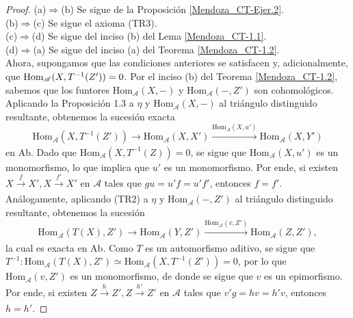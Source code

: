 \documentclass[tesis]{subfiles}
\begin{document}
\begin{proof}\leavevmode

    (a)$\Rightarrow$(b) Se sigue de la Proposición \ref{Mendoza_CT-Ejer.2}. \\

    (b)$\Rightarrow$(c) Se sigue el axioma (TR3). \\

    (c)$\Rightarrow$(d) Se sigue del inciso (b) del Lema \ref{Mendoza_CT-1.1}. \\

    (d)$\Rightarrow$(a) Se sigue del inciso (a) del Teorema \ref{Mendoza_CT-1.2}. \\

    Ahora, supongamos que las condiciones anteriores se satisfacen y, adicionalmente, que $\text{Hom}_\mathscr{A}(X,\break T^{-1}(Z'))=0$. Por el inciso (b) del Teorema \ref{Mendoza_CT-1.2}, sabemos que los funtores $\text{Hom}_\mathscr{A}(X,-)$ y $\text{Hom}_\mathscr{A}(-,Z')$ son cohomológicos. Aplicando la Proposición 1.3 a $\eta$ y $\text{Hom}_\mathscr{A}(X,-)$ al triángulo distinguido resultante, obtenemos la sucesión exacta
    \[
        \text{Hom}_\mathscr{A}(X,T^{-1}(Z')) \to \text{Hom}_\mathscr{A}(X,X') \xrightarrow[]{\text{Hom}_\mathscr{A}(X,u')} \text{Hom}_\mathscr{A}(X,Y')
    \] 
    en Ab. Dado que $\text{Hom}_\mathscr{A}(X,T^{-1}(Z)) = 0$, se sigue que $\text{Hom}_\mathscr{A}(X,u')$ es un monomorfismo, lo que implica que $u'$ es un monomorfismo. Por ende, si existen $X\xrightarrow[]{f}X', X\xrightarrow[]{f'}X'$ en $\mathscr{A}$ tales que $gu = u'f = u'f'$, entonces $f=f'$. \\

    Análogamente, aplicando (TR2) a $\eta$ y $\text{Hom}_\mathscr{A}(-,Z')$ al triángulo distinguido resultante, obtenemos la sucesión
    \[
        \text{Hom}_\mathscr{A}(T(X),Z') \to \text{Hom}_\mathscr{A}(Y,Z') \xrightarrow[]{\text{Hom}_\mathscr{A}(v,Z')} \text{Hom}_\mathscr{A}(Z,Z'),
    \] 
    la cual es exacta en Ab. Como $T$ es un automorfismo aditivo, se sigue que $T^{-1}:\text{Hom}_\mathscr{A}(T(X),Z')\simeq\text{Hom}_\mathscr{A}(X,T^{-1}(Z'))=0$, por lo que $\text{Hom}_\mathscr{A}(v,Z')$ es un monomorfismo, de donde se sigue que $v$ es un epimorfismo. Por ende, si existen $Z\xrightarrow[]{h}Z', Z\xrightarrow[]{h'}Z'$ en $\mathscr{A}$ tales que $v'g = hv = h'v$, entonces $h=h'$.
\end{proof}
\end{document}
